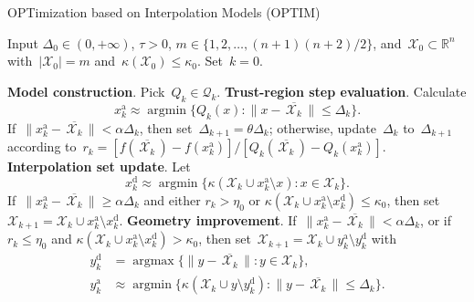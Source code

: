 \documentclass[11pt,a4paper,draft]{article}  %
\theoremstyle{definition}
\numberwithin{equation}{section}
\newcommand{\mbar}[1]{\,\overline{\!{#1}\!}\,} %
\newcommand{\xopt}{\mbar}
\DeclareMathOperator*{\argmax}{argmax}
\DeclareMathOperator*{\argmin}{argmin}
\newcommand{\RR}{\mathbb{R}}
\newcommand{\Int}{\mathcal{X}}
\newcommand{\Qua}{\mathcal{Q}}
\newcommand{\add}{{\textrm{a}}}
\newcommand{\drop}{{\textrm{d}}}
\begin{document}
\begin{algorithm}[htbp!]
    \caption{\label{alg:optim}OPTimization based on Interpolation Models (OPTIM)}
    Input $\Delta_0\in (0,+\infty)$, $\tau>0$, $m\in \{1, 2, \dots, (n+1)(n+2)/2\}$,
    and~$\Int_0\subset \RR^n$ with~$|\Int_0|=m$ and~$\kappa(\Int_0) \le \kappa_0$. Set~$k=0$.
    \begin{algorithmic}[1]
        \State \textbf{Model construction}.
        Pick~$Q_k \in \Qua_k$.
        \State \textbf{Trust-region step evaluation}.
        Calculate
        \begin{equation}
         \label{eq:xadd}
         x_k^\add \approx \argmin\{Q_k(x)\mathrel{:} \|x-\xopt{\Int_k}\|\le \Delta_k\}.
        \end{equation}
        If~$\|x_k^\add-\xopt{\Int_k}\| < \alpha\Delta_k$, then set~$\Delta_{k+1} = \theta \Delta_k$;
        otherwise, update~$\Delta_k$ to~$\Delta_{k+1}$ according to~$r_k = [f(\xopt{\Int_k})
        - f(x_k^\add)]/[Q_k(\xopt{\Int_k}) - Q_k(x_k^\add)]$.
        \State \textbf{Interpolation set update}.
        Let
        \begin{equation}
            \label{eq:xdrop}
            x_k^\drop \approx \argmin\{\kappa(\Int_k\cup x_k^\add\setminus x) \mathrel{:} x \in
            \Int_k\}.
        \end{equation}
        If~$\|x_k^\add-\xopt{\Int_k}\| \ge \alpha\Delta_k$
        and either $r_k>\eta_0$ or $\kappa(\Int_k\cup x_k^\add \setminus x_k^\drop) \le \kappa_0$,
        then set~$\Int_{k+1} = \Int_k\cup x_k^\add\setminus x_k^\drop$.
        \State \textbf{Geometry improvement}.
        If~$\|x_k^\add-\xopt{\Int_k}\|< \alpha \Delta_k$, or if~$r_k\le \eta_0$ and $\kappa(\Int_k
        \cup x_k^\add\setminus x_k^\drop) > \kappa_0$, then set~$\Int_{k+1} = \Int_k\cup
        y_k^\add\setminus y_k^\drop$ with
          \begin{align}
              \label{eq:ydrop}
              y_k^\drop &= \argmax\{\|y-\xopt{\Int_k}\| \mathrel{:} y \in \Int_k\}, \\
              \label{eq:yadd}
              y_k^\add &\approx \argmin\{\kappa(\Int_k \cup y \setminus y_k^\drop) \mathrel{:}
                  \|y-\xopt{\Int_k}\|\le
              \Delta_k\}.
          \end{align}
    \end{algorithmic}
\end{algorithm}
\end{document}
